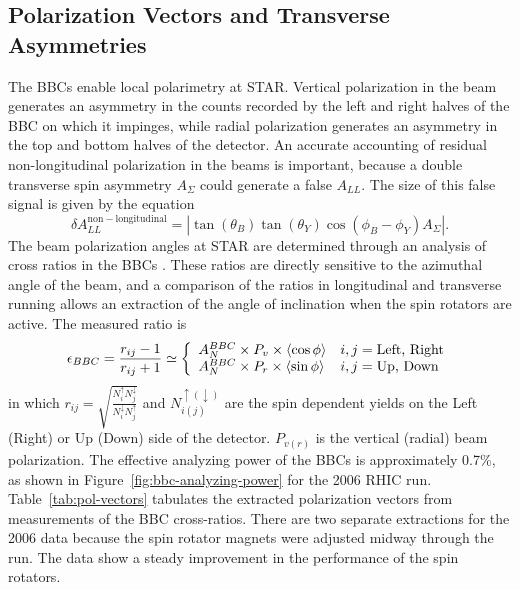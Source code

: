 \subsection{Polarization Vectors and Transverse Asymmetries}

The BBCs enable local polarimetry at STAR.  Vertical polarization in the beam generates an asymmetry in the counts recorded by the left and right halves of the BBC on which it impinges, while radial polarization generates an asymmetry in the top and bottom halves of the detector.  An accurate accounting of residual non-longitudinal polarization in the beams is important, because a double transverse spin asymmetry \(A_{\Sigma}\) could generate a false \(A_{LL}\).  The size of this false signal is given by the equation
%
\begin{equation}
  \delta A_{LL}^{\mathrm{non-longitudinal}} = | \tan(\theta_B) \tan(\theta_Y) \cos(\phi_B - \phi_Y) A_{\Sigma} |.
  \label{eqn:pol-vector-uncertainty}
\end{equation}
%
The beam polarization angles at STAR are determined through an analysis of cross ratios in the BBCs \cite{Kiryluk:2005gg}.  These ratios are directly sensitive to the azimuthal angle of the beam, and a comparison of the ratios in longitudinal and transverse running allows an extraction of the angle of inclination when the spin rotators are active.  The measured ratio is 
%
\begin{equation}
  \epsilon_{BBC} = \frac{r_{ij} -1}{r_{ij} + 1} \simeq \left\{
  \begin{array}{l l}
    A_N^{BBC} \times P_v \times \langle \cos \phi \rangle & i,j = \mbox{Left, Right} \\
    A_N^{BBC} \times P_r \times \langle \sin \phi \rangle & i,j = \mbox{Up, Down} \\
  \end{array} \right.
\end{equation}
%
in which \(r_{ij} = \sqrt{\frac{N_i^{\uparrow} N_j^{\downarrow}}{N_i^{\downarrow} N_j^{\uparrow}}}\) and \(N_{i(j)}^{\uparrow(\downarrow)}\) are the spin dependent yields on the Left (Right) or Up (Down) side of the detector. \(P_{v(r)}\) is the vertical (radial) beam polarization.  The effective analyzing power of the BBCs is approximately 0.7\%, as shown in Figure~\ref{fig:bbc-analyzing-power} for the 2006 RHIC run. Table~\ref{tab:pol-vectors} tabulates the extracted polarization vectors from measurements of the BBC cross-ratios.  There are two separate extractions for the 2006 data because the spin rotator magnets were adjusted midway through the run.  The data show a steady improvement in the performance of the spin rotators.

